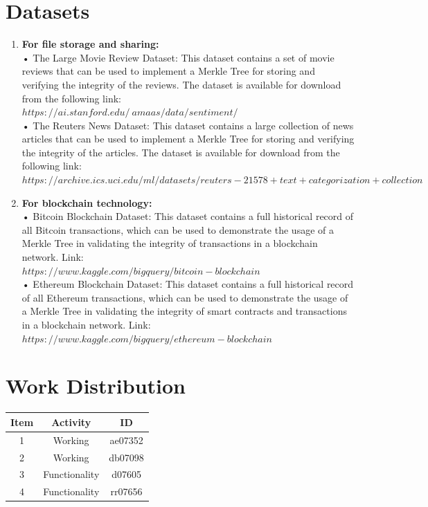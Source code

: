 \documentclass{article}
\begin{document}
\newpage
\section{Datasets}
    \begin{enumerate}
     \item \textbf{For file storage and sharing:}\\ •	The Large Movie Review Dataset: This dataset contains a set of movie reviews that can be used to implement a Merkle Tree for storing and verifying the integrity of the reviews. The dataset is available for download from the following link: \\$https://ai.stanford.edu/~amaas/data/sentiment/$  \\
        •	The Reuters News Dataset: This dataset contains a large collection of news articles that can be used to implement a Merkle Tree for storing and verifying the integrity of the articles. The dataset is available for download from the following link: \\$https://archive.ics.uci.edu/ml/datasets/reuters-21578+text+categorization+collection$ 
        
        \item \textbf{For blockchain technology:} \\ •	Bitcoin Blockchain Dataset: This dataset contains a full historical record of all Bitcoin transactions, which can be used to demonstrate the usage of a Merkle Tree in validating the integrity of transactions in a blockchain network. Link: \\$https://www.kaggle.com/bigquery/bitcoin-blockchain$
        \\•	Ethereum Blockchain Dataset: This dataset contains a full historical record of all Ethereum transactions, which can be used to demonstrate the usage of a Merkle Tree in validating the integrity of smart contracts and transactions in a blockchain network. Link: \\$https://www.kaggle.com/bigquery/ethereum-blockchain$ 
        
\end{enumerate}

\newpage
\section{Work Distribution}
\begin{center}
  \begin{table}[h]
    \centering
    \begin{tabular}{|c|c|c|}
      \hline
      Item & Activity   & ID      \\ \hline
      1    & Working & ae07352 \\ \hline
      2    & Working & db07098 \\ \hline
      3    & Functionality & d07605 \\ \hline
      4    & Functionality & rr07656 \\ \hline
    \end{tabular}

    \label{tab:my-table6}
  \end{table}
\end{center}
\end{document}
